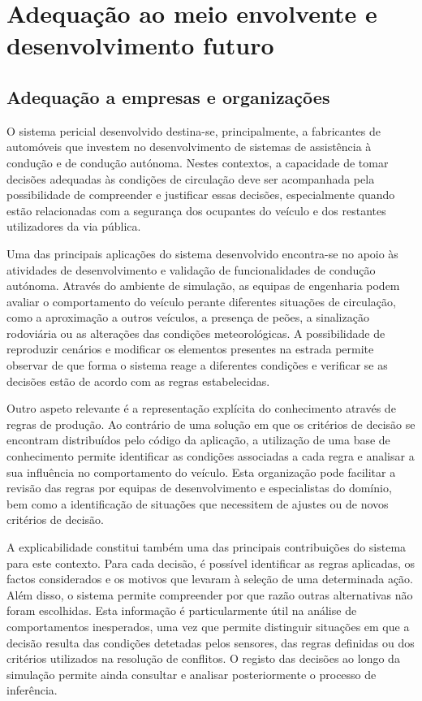 \chapter{Adequação ao meio envolvente e desenvolvimento futuro}\label{cap:adequacao}

\section{Adequação a empresas e organizações}\label{sec:empresas}

O sistema pericial desenvolvido destina-se, principalmente, a fabricantes de automóveis que
investem no desenvolvimento de sistemas de assistência à condução e de condução autónoma. Nestes
contextos, a capacidade de tomar decisões adequadas às condições de circulação deve ser acompanhada
pela possibilidade de compreender e justificar essas decisões, especialmente quando estão
relacionadas com a segurança dos ocupantes do veículo e dos restantes utilizadores da via pública.

Uma das principais aplicações do sistema desenvolvido encontra-se no apoio às atividades de desenvolvimento e validação de funcionalidades de condução autónoma. Através do ambiente de simulação, as equipas de engenharia podem avaliar o comportamento do veículo perante diferentes situações de circulação, como a aproximação a outros veículos, a presença de peões, a sinalização rodoviária ou as alterações das condições meteorológicas. A possibilidade de reproduzir cenários e modificar os elementos presentes na estrada permite observar de que forma o sistema reage a diferentes condições e verificar se as decisões estão de acordo com as regras estabelecidas.

Outro aspeto relevante é a representação explícita do conhecimento através de regras de produção.
Ao contrário de uma solução em que os critérios de decisão se encontram distribuídos pelo código da
aplicação, a utilização de uma base de conhecimento permite identificar as condições associadas a
cada regra e analisar a sua influência no comportamento do veículo. Esta organização pode facilitar
a revisão das regras por equipas de desenvolvimento e especialistas do domínio, bem como a
identificação de situações que necessitem de ajustes ou de novos critérios de decisão.

A explicabilidade constitui também uma das principais contribuições do sistema para este contexto.
Para cada decisão, é possível identificar as regras aplicadas, os factos considerados e os motivos
que levaram à seleção de uma determinada ação. Além disso, o sistema permite compreender por que
razão outras alternativas não foram escolhidas. Esta informação é particularmente útil na análise
de comportamentos inesperados, uma vez que permite distinguir situações em que a decisão resulta
das condições detetadas pelos sensores, das regras definidas ou dos critérios utilizados na
resolução de conflitos. O registo das decisões ao longo da simulação permite ainda consultar e
analisar posteriormente o processo de inferência.

